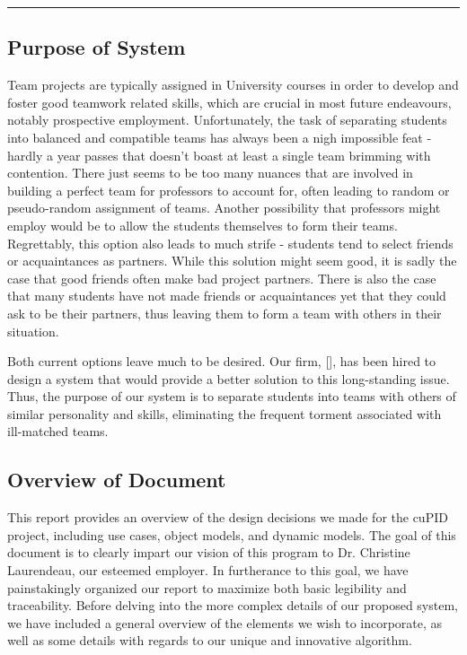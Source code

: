 \documentclass[12pt,letterpaper]{article}
\begin{document}
\begin{center}
    \rule{0.85\textwidth}{0.5pt}
\end{center}

\subsection{Purpose of System}

Team projects are typically assigned in University courses in order to develop and foster
good teamwork related skills, which are crucial in most future endeavours, notably 
prospective employment. Unfortunately, the task of separating students into balanced 
and compatible teams has always been a nigh impossible feat - hardly a year passes that doesn't
boast at least a single team brimming with  contention. There just seems to be too many
nuances that are involved in building a perfect team for professors to account for, often leading
to random or pseudo-random assignment of teams. Another possibility that professors might employ
would be to allow the students themselves to form their teams. Regrettably, this option also
leads to much strife - students tend to select friends or acquaintances as partners. While this
solution might seem good, it is sadly the case that good friends often make bad project partners. 
There is also the case that many students have not made friends or acquaintances yet that they 
could ask to be their partners, thus leaving them to form a team with others in their situation.

Both current options leave much to be desired. Our firm, [\teamname{}], has been hired
to design a system that would provide a better solution to this long-standing issue. Thus, the purpose of
our system is to separate students into teams with others of similar personality and skills, eliminating 
the frequent torment associated with ill-matched teams.

\subsection{Overview of Document}

This report provides an overview of the design decisions we made for the cuPID project, including 
use cases, object models, and dynamic models. The goal of this document is to clearly impart our vision of this
program to Dr. Christine Laurendeau, our esteemed employer. In furtherance to this goal, we have painstakingly 
organized our report to maximize both basic legibility and traceability. Before delving into the more complex details 
of our proposed system, we have included a general overview of the elements we wish to incorporate, as well as 
some details with regards to our unique and innovative algorithm.
\end{document}
